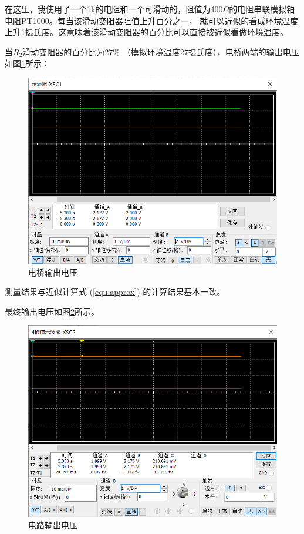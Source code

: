 \documentclass{article}
\begin{document}
\begin{spacing}{1.5}
    在这里，我使用了一个1k的电阻和一个可滑动的，阻值为400$\Omega$的电阻串联模拟铂电阻PT1000。每当该滑动变阻器阻值上升百分之一，
    就可以近似的看成环境温度上升1摄氏度。这意味着该滑动变阻器的百分比可以直接被近似看做环境温度。

    当$R_2$滑动变阻器的百分比为27\% （模拟环境温度27摄氏度），电桥两端的输出电压如图\ref{fig:sim3_result1}所示：
    \begin{figure}[H]
        \centering
        \includegraphics[scale=0.4]{fig/sim/sim3_result1.png}
        \caption{电桥输出电压}
        \label{fig:sim3_result1}
    \end{figure}

    测量结果与近似计算式 (\ref{equ:approx}) 的计算结果基本一致。
    
    最终输出电压如图\ref{fig:sim3_result2}所示。

    \begin{figure}[H]
        \centering
        \includegraphics[scale=0.4]{fig/sim/sim3_result2.png}
        \caption{电路输出电压}
        \label{fig:sim3_result2}
    \end{figure}


\end{spacing}
\end{document}
